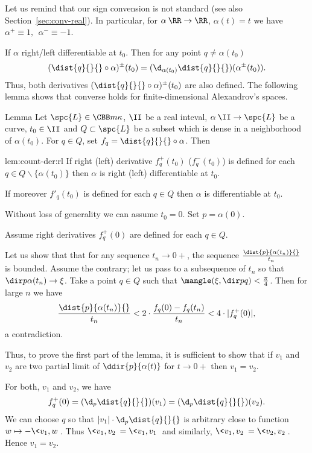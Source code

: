 Let us remind that our sign convension is not standard (see also Section~\ref{sec:conv-real}). 
In particular, for $\alpha\:\RR\to \RR$, $\alpha(t)=t$ we have $\alpha^+\equiv 1,\ \ \alpha^-\equiv -1$.

If $\alpha$ right/left differentiable at $t_0$.
Then for any point $q\not=\alpha(t_0)$
\[(\dist{q}{}{}\circ\alpha)^\pm(t_0)
=
(\d_{\alpha(t_0)}\dist{q}{}{})(\alpha^\pm(t_0)).\]
Thus, both derivatives $(\dist{q}{}{}\circ\alpha)^\pm(t_0)$ are also defined.
The following lemma shows that converse holds for finite-dimensional Alexandrov's spaces.


\begin{thm}{Lemma}\label{lem:count-der}
Let $\spc{L}\in\CBB m\kappa$,
$\II$ be a real inteval,
$\alpha\:\II\to \spc{L}$ be a curve,
$t_0\in\II$ 
and $Q\subset \spc{L}$ be a subset which is dense in a neighborhood of $\alpha(t_0)$.
For $q\in Q$, set $f_q=\dist{q}{}{}\circ\alpha$.
Then 
\begin{subthm}{lem:count-der:rl}
If right (left) derivative $f^+_q(t_0)$ ($f^-_q(t_0)$) is defined for each $q\in Q\backslash \{\alpha(t_0)\}$ then $\alpha$ is right (left) differentiable at $t_0$.
\end{subthm}

\begin{subthm}{} If moreover $f'_q(t_0)$ is defined for each $q\in Q$ then $\alpha$ is differentiable at $t_0$.
\end{subthm}
\end{thm}



Without loss of generality we can assume $t_0=0$. Set $p=\alpha(0)$.

Assume right derivatives $f^+_q(0)$ are defined for each $q\in Q$.

Let us show that that for any sequence $t_n\to 0+$, the sequence $\frac{\dist{p}{\alpha(t_n)}{}}{t_n}$ is bounded.
Assume the contrary;
let us pass to a subsequence of $t_n$ so that $\dir p{\alpha(t_n)}\to\xi$.
Take a point $q\in Q$ such that $\mangle(\xi,\dir p q)<\tfrac\pi4$.
Then for large $n$ we have 
\[\frac{\dist{p}{\alpha(t_n)}{}}{t_n}
<
2\cdot\frac{f_q(0)-f_q(t_n)}{t_n}
<
4\cdot|f^+_q(0)|,\] a 
contradiction.

Thus, to prove the first part of the lemma, 
it is sufficient to show that if $v_1$ and $v_2$ are two partial limit of $\ddir{p}{\alpha(t)}$ for $t\to 0+$ then $v_1=v_2$.

For both, $v_1$ and $v_2$, we have
\[f_q^+(0)=(\d_p\dist{q}{}{})(v_1)=(\d_p\dist{q}{}{})(v_2).\]
We can choose $q$ so that $|v_1|\cdot\d_p\dist{q}{}{}$ is arbitrary close to function $w\mapsto -\<v_1,w\>$.
Thus $\<v_1,v_2\>=\<v_1,v_1\>$ and similarly, $\<v_1,v_2\>=\<v_2,v_2\>$. 
Hence $v_1=v_2$.
\qeds

